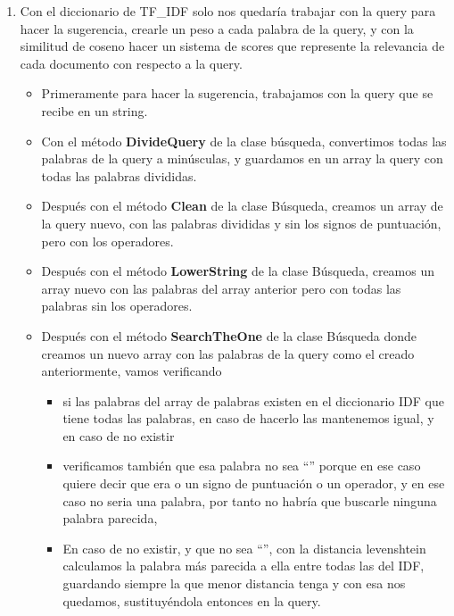 \documentclass[12pt, a4paper]{article}
\begin{document}
\begin{enumerate}
      \item Con el diccionario de TF\_IDF solo nos quedaría trabajar con la query para hacer la
            sugerencia, crearle un peso a cada palabra de la query, y con la similitud de
            coseno hacer un sistema de scores que represente la relevancia de
            cada documento con respecto a la query.
            \begin{itemize}
                  \item Primeramente para hacer la sugerencia, trabajamos con la query que
                        se recibe en un string.
                  \item Con el método \textbf{DivideQuery} de la clase búsqueda,
                        convertimos todas las palabras de la query a minúsculas, y guardamos en un array
                        la query con todas las palabras divididas.
                  \item Después con el método \textbf{Clean} de la clase Búsqueda,
                        creamos un array de la query nuevo, con las palabras divididas y
                        sin los signos de puntuación, pero con los operadores.
                  \item Después con el método \textbf{LowerString} de la clase Búsqueda,
                        creamos un array nuevo con las palabras del array anterior pero
                        con todas las palabras sin los operadores.
                  \item Después con el método \textbf{SearchTheOne} de la clase Búsqueda
                        donde creamos un nuevo array con las palabras de la query
                        como el creado anteriormente, vamos verificando

                        \begin{itemize}
                              \item si las palabras del array de palabras existen en el diccionario IDF
                                    que tiene todas las palabras, en caso de hacerlo las mantenemos igual,
                                    y en caso de no existir
                              \item verificamos también que esa palabra no sea “”
                                    porque en ese caso quiere decir que era o un signo de puntuación o un operador,
                                    y en ese caso no seria una palabra, por tanto no habría que buscarle
                                    ninguna palabra parecida,
                              \item En caso de no existir, y que no sea “”,
                                    con la distancia levenshtein calculamos la palabra más parecida a ella entre todas
                                    las del IDF, guardando siempre la que menor distancia tenga y con esa
                                    nos quedamos, sustituyéndola entonces en la query.



\end{itemize}
\end{itemize}
\end{enumerate}
\end{document}
